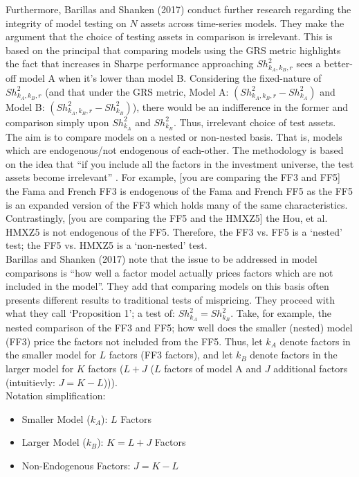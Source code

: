 \documentclass[11pt, english]{article}
\begin{document}
        Furthermore, Barillas and Shanken (2017) conduct further research regarding the integrity of model testing on $N$ assets across time-series models. They make the argument that the choice of testing assets in comparison is irrelevant. This is based on the principal that comparing models using the GRS metric highlights the fact that increases in Sharpe performance approaching $Sh_{k_{A},k_{B},r}^2$ sees a better-off model A when it's lower than model B. Considering the fixed-nature of $Sh_{k_{A},k_{B},r}^2$ (and that under the GRS metric, Model A: $(Sh_{k_{A},k_{B},r}^2-Sh_{k_{A}}^2)$ and Model B: $(Sh_{k_{A},k_{B},r}^2-Sh_{k_{B}}^2)$), there would be an indifference in the former and comparison simply upon $Sh_{k_{A}}^2$ and $Sh_{k_{B}}^2$. Thus, irrelevant choice of test assets.\\

        The aim is to compare models on a nested or non-nested basis. That is, models which are endogenous/not endogenous of each-other. The methodology is based on the idea that ``if you include all the factors in the investment universe, the test assets become irrelevant'' . For example, [you are comparing the FF3 and FF5] the Fama and French FF3 is endogenous of the Fama and French FF5 as the FF5 is an expanded version of the FF3 which holds many of the same characteristics. Contrastingly, [you are comparing the FF5 and the HMXZ5] the Hou, et al. HMXZ5 is not endogenous of the FF5. Therefore, the FF3 vs. FF5 is a `nested' test; the FF5 vs. HMXZ5 is a `non-nested' test.\\

        Barillas and Shanken (2017) note that the issue to be addressed in model comparisons is ``how well a factor model actually prices factors which are not included in the model''. They add that comparing models on this basis often presents different results to traditional tests of mispricing. They proceed with what they call `Proposition 1'; a test of: $Sh_{k_{A}}^2=Sh_{k_{B}}^2$. Take, for example, the nested comparison of the FF3 and FF5; how well does the smaller (nested) model (FF3) price the factors not included from the FF5. Thus, let $k_A$ denote factors in the smaller model for $L$ factors (FF3 factors), and let $k_B$ denote factors in the larger model for $K$ factors ($L+J$ ($L$ factors of model A and $J$ additional factors (intuitievly: $J=K-L$))).\\

        Notation simplification:

        \begin{itemize}
        \setlength\itemsep{0cm}
                \item Smaller Model ($k_{A}$): $L$ Factors
                \item Larger Model ($k_{B}$): $K=L+J$ Factors
                \item Non-Endogenous Factors: $J=K-L$
        \end{itemize}
\end{document}
